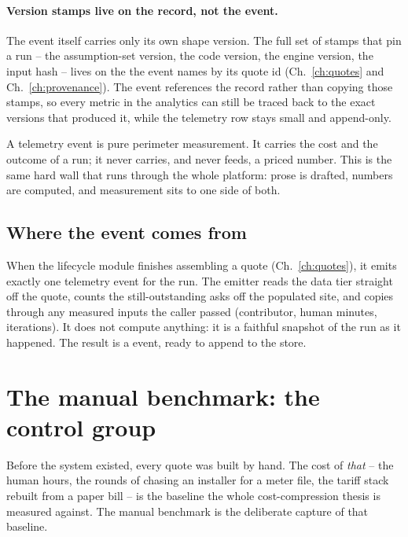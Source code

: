 \paragraph{Version stamps live on the record, not the event.} The event itself carries only its own shape version. The full set of stamps that pin a run -- the assumption-set version, the code version, the engine version, the input hash -- lives on the  the event names by its quote id (Ch.~\ref{ch:quotes} and Ch.~\ref{ch:provenance}). The event references the record rather than copying those stamps, so every metric in the analytics can still be traced back to the exact versions that produced it, while the telemetry row stays small and append-only.

\begin{keyidea}
A telemetry event is pure perimeter measurement. It carries the cost and the outcome of a run; it never carries, and never feeds, a priced number. This is the same hard wall that runs through the whole platform: prose is drafted, numbers are computed, and measurement sits to one side of both.
\end{keyidea}

\subsection{Where the event comes from}

When the lifecycle module finishes assembling a quote (Ch.~\ref{ch:quotes}), it emits exactly one telemetry event for the run. The emitter reads the data tier straight off the quote, counts the still-outstanding asks off the populated site, and copies through any measured inputs the caller passed (contributor, human minutes, iterations). It does not compute anything: it is a faithful snapshot of the run as it happened. The result is a  event, ready to append to the store.

\section{The manual benchmark: the control group}

Before the system existed, every quote was built by hand. The cost of \emph{that} -- the human hours, the rounds of chasing an installer for a meter file, the tariff stack rebuilt from a paper bill -- is the baseline the whole cost-compression thesis is measured against. The manual benchmark is the deliberate capture of that baseline.

